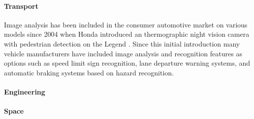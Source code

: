 	\paragraph{Transport}
	Image analysis has been included in the consumer automotive market on various models since 2004 when Honda introduced an thermographic night vision camera with pedestrian detection on the Legend  \citep{hondanightvision}. Since this initial introduction many vehicle manufacturers have included image analysis and recognition features as options such as speed limit sign recognition, lane departure warning systems, and automatic braking systems based on hazard recognition.
	\paragraph{Engineering}
	\paragraph{Space}